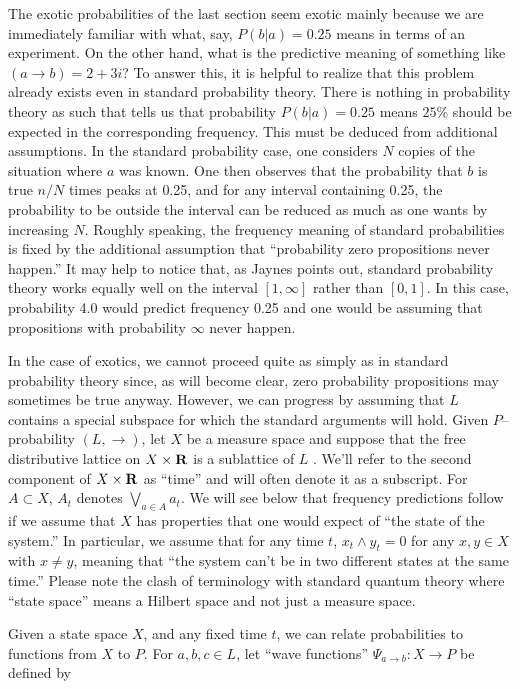 \documentclass[12pt]{article}
\begin{document}
    The exotic probabilities of the last section seem exotic mainly because 
we are immediately familiar with what, say, $P(b|a)=0.25$ means in terms of 
an experiment.  On the other hand, what is the predictive meaning of something 
like $(a\rightarrow b)=2+3i$?  To answer this, it is helpful to realize that
this problem already exists even in standard probability theory.  There is 
nothing in probability theory as such that tells us that probability $P(b|a)=0.25$ 
means $25{\%}$ should be expected in the corresponding frequency.  This must be 
deduced from additional assumptions.  In the standard probability case,
one considers $N$ copies of the situation where $a$ was known.  One
then observes that the probability that $b$ is true $n/N$ times peaks
at 0.25, and for any interval containing 0.25, the probability to be outside
the interval can be reduced as much as one wants by increasing $N$. Roughly 
speaking, the frequency meaning of standard
probabilities is fixed by the additional assumption that ``probability
zero propositions never happen.''  It may help to notice that, as Jaynes
points out\cite{ejaynes}, standard probability theory works equally
well on the interval $[1,\infty]$ rather
than $[0,1]$.  In this case, probability 4.0 would predict frequency
0.25 and one would be assuming that propositions with probability $\infty$ 
never happen.

    In the case of exotics, we cannot proceed quite as simply as in 
standard probability theory since, as will become clear, zero probability
propositions may sometimes be true anyway.  However, we can progress by 
assuming that $L$ contains a special subspace for which the standard
arguments will hold.  
Given $P$--probability $(L,\rightarrow)$, let $X$ be a measure space
and suppose that the free distributive
lattice on $X\times {\bf R}$ is a sublattice of $L$ \cite{nonmeasurablesets}.
We'll refer to the second component of $X\times {\bf R}$ as ``time'' and will 
often denote it as a subscript.  
For $A\subset X$, $A_t$ denotes $\bigvee_{a\in A} a_t$.
We will see below that frequency predictions follow if we assume
that $X$ has properties that one would expect of ``the state of the 
system.''  In particular, we assume that 
for any time $t$, $x_t\wedge y_t=0$ for
any $x,y\in X$ with $x\neq y$, meaning that ``the system can't be in two 
different states at the same time.''
Please note the clash of terminology 
with standard quantum theory where ``state space'' means a Hilbert space
and not just a measure space.

Given a state space $X$, and any fixed time $t$, we can relate probabilities to 
functions from $X$ to $P$.
For $a,b,c\in L$, let ``wave functions''
$\Psi_{a\rightarrow b}:X\rightarrow P$ be defined by
\end{document}
